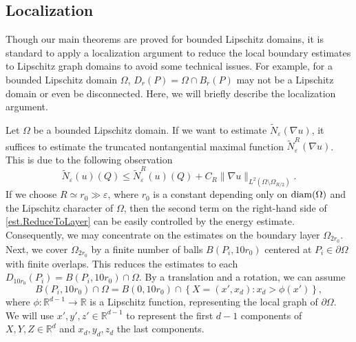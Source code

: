 \documentclass[reqno,12pt]{amsart} %
\theoremstyle{definition}
\theoremstyle{remark}
\numberwithin{equation}{section}
\newcommand{\R}{\mathbb{R}}
\newcommand{\e}{\varepsilon}
\newcommand{\jz}[1]{\textcolor{red}{#1}}
\begin{document}
\subsection{Localization}
\label{subsec.localization}
Though our main theorems are proved for bounded Lipschitz domains, it is standard to apply a localization argument to reduce the local boundary estimates to Lipschitz graph domains to avoid some technical issues. For example, for a bounded Lipschitz domain $\Omega$, $D_r(P) = \Omega\cap B_r(P)$ may not be a Lipschitz domain or even be disconnected. Here, we will briefly describe the localization argument.

Let $\Omega$ be a bounded Lipschitz domain. If we want to estimate $\widetilde{N}_\e(\nabla u)$, it suffices to estimate the truncated nontangential maximal function $\widetilde{N}_\e^R(\nabla u)$. This is due to the following observation
\begin{equation}\label{est.ReduceToLayer}
    \widetilde{N}_\e(u)(Q) \le \widetilde{N}_\e^{R}(u)(Q) + C_R \| \nabla u \|_{L^2(\Omega\setminus \Omega_{R/2})}.
\end{equation}
If we choose $R \simeq r_0 \gg \e$, where $r_0$ is a constant depending only on ${\rm diam}(\Omega)$ and the Lipschitz character of $\Omega$, then the second term on the right-hand side of \eqref{est.ReduceToLayer} can be easily controlled by the energy estimate. 
Consequently, we may concentrate on the estimates on the boundary layer $\Omega_{2r_0}$. Next, we cover $\Omega_{2r_0}$ by a finite number of balls $B(P_i,10r_0)$ centered at $P_i \in \partial \Omega$ with finite overlaps. This reduces the estimates to each $ D_{10r_0}(P_i) = B(P_i, 10r_0) \cap \Omega$. By a translation and a rotation, we can assume
\begin{equation}\label{eq.graphdomain}
    B(P_i, 10r_0) \cap \Omega = B(0,10r_0) \cap \left\{ X = (x',x_d): x_d > \phi(x') \right\},
\end{equation}
where $\phi:\R^{d-1} \to \R$ is a Lipschitz function, representing the local graph of $\partial \Omega$. We will use $x',y',z' \in \R^{d-1}$ to represent the first $d-1$ components of $X,Y,Z \in \R^d$ and $x_d, y_d, z_d$  the last components.

\end{document}
